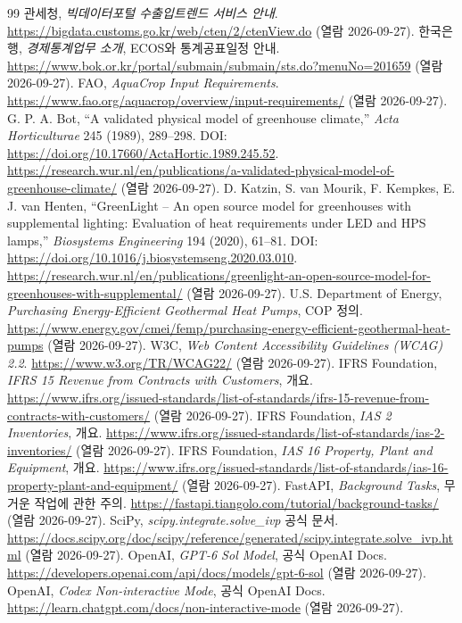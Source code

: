 \documentclass[11pt,a4paper]{article}
\begin{document}
\begin{thebibliography}{99}
 관세청, \emph{빅데이터포털 수출입트렌드 서비스 안내}. \url{https://bigdata.customs.go.kr/web/cten/2/ctenView.do} (열람 2026-09-27).
 한국은행, \emph{경제통계업무 소개}, ECOS와 통계공표일정 안내. \url{https://www.bok.or.kr/portal/submain/submain/sts.do?menuNo=201659} (열람 2026-09-27).
 FAO, \emph{AquaCrop Input Requirements}. \url{https://www.fao.org/aquacrop/overview/input-requirements/} (열람 2026-09-27).
 G. P. A. Bot, ``A validated physical model of greenhouse climate,'' \emph{Acta Horticulturae} 245 (1989), 289--298. DOI: \url{https://doi.org/10.17660/ActaHortic.1989.245.52}. \url{https://research.wur.nl/en/publications/a-validated-physical-model-of-greenhouse-climate/} (열람 2026-09-27).
 D. Katzin, S. van Mourik, F. Kempkes, E. J. van Henten, ``GreenLight -- An open source model for greenhouses with supplemental lighting: Evaluation of heat requirements under LED and HPS lamps,'' \emph{Biosystems Engineering} 194 (2020), 61--81. DOI: \url{https://doi.org/10.1016/j.biosystemseng.2020.03.010}. \url{https://research.wur.nl/en/publications/greenlight-an-open-source-model-for-greenhouses-with-supplemental/} (열람 2026-09-27).
 U.S. Department of Energy, \emph{Purchasing Energy-Efficient Geothermal Heat Pumps}, COP 정의. \url{https://www.energy.gov/cmei/femp/purchasing-energy-efficient-geothermal-heat-pumps} (열람 2026-09-27).
 W3C, \emph{Web Content Accessibility Guidelines (WCAG) 2.2}. \url{https://www.w3.org/TR/WCAG22/} (열람 2026-09-27).
 IFRS Foundation, \emph{IFRS 15 Revenue from Contracts with Customers}, 개요. \url{https://www.ifrs.org/issued-standards/list-of-standards/ifrs-15-revenue-from-contracts-with-customers/} (열람 2026-09-27).
 IFRS Foundation, \emph{IAS 2 Inventories}, 개요. \url{https://www.ifrs.org/issued-standards/list-of-standards/ias-2-inventories/} (열람 2026-09-27).
 IFRS Foundation, \emph{IAS 16 Property, Plant and Equipment}, 개요. \url{https://www.ifrs.org/issued-standards/list-of-standards/ias-16-property-plant-and-equipment/} (열람 2026-09-27).
 FastAPI, \emph{Background Tasks}, 무거운 작업에 관한 주의. \url{https://fastapi.tiangolo.com/tutorial/background-tasks/} (열람 2026-09-27).
 SciPy, \emph{scipy.integrate.solve\_ivp} 공식 문서. \url{https://docs.scipy.org/doc/scipy/reference/generated/scipy.integrate.solve_ivp.html} (열람 2026-09-27).
 OpenAI, \emph{GPT-6 Sol Model}, 공식 OpenAI Docs. \url{https://developers.openai.com/api/docs/models/gpt-6-sol} (열람 2026-09-27).
 OpenAI, \emph{Codex Non-interactive Mode}, 공식 OpenAI Docs. \url{https://learn.chatgpt.com/docs/non-interactive-mode} (열람 2026-09-27).
\end{thebibliography}
\end{document}
